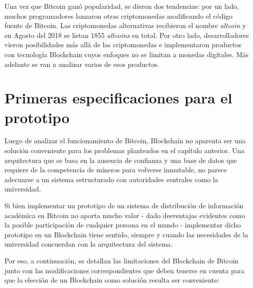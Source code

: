Una vez que Bitcoin ganó popularidad, se dieron dos tendencias: por un lado, muchos programadores lanzaron otras criptomonedas modificando el código fuente de Bitcoin. Las criptomonedas alternativas recibieron el nombre \textit{altcoin} y en Agosto del 2018 se listan 1855 \textit{altcoins} en total\cite{altcoins}. Por otro lado, desarrolladores vieron posibilidades más allá de las criptomonedas e implementaron productos con tecnología Blockchain cuyos enfoques no se limitan a monedas digitales. Más adelante se van a analizar varios de esos productos.

\section{Primeras especificaciones para el prototipo}
\label{sec:primeras_especificaciones_prototipo}

Luego de analizar el funcionamiento de Bitcoin, Blockchain no aparenta ser una solución conveniente para los problemas planteados en el capítulo anterior. Una arquitectura que se basa en la ausencia de confianza y una base de datos que requiere de la competencia de mineros para volverse inmutable, no parece adecuarse a un sistema estructurado con autoridades centrales como la universidad. 

Si bien implementar un prototipo de un sistema de distribución de información académica en Bitcoin no aporta mucho valor - dado desventajas evidentes como la posible participación de cualquier persona en el mundo - implementar dicho prototipo en un Blockchain tiene sentido, siempre y cuando las necesidades de la universidad concuerdan con la arquitectura del sistema.

Por eso, a continuación, se detallan las limitaciones del Blockchain de Bitcoin junto con las modificaciones correspondientes que deben tenerse en cuenta para que la elección de un Blockchain como solución resulta ser conveniente:

